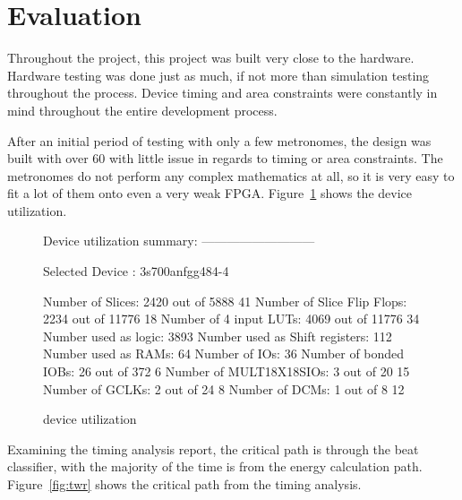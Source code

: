 \documentclass[letterpaper]{article}
\begin{document}
\section{Evaluation}
    Throughout the project, this project was built very close to the hardware.
    Hardware testing was done just as much, if not more than simulation testing
    throughout the process.  Device timing and area constraints were constantly
    in mind throughout the entire development process.

    After an initial period of testing with only a few metronomes, the design
    was built with over 60 with little issue in regards to timing or area
    constraints.  The metronomes do not perform any complex mathematics at all,
    so it is very easy to fit a lot of them onto even a very weak FPGA.
    Figure~\ref{fig:xst} shows the device utilization.


    \begin{figure}
        \centering
\begin{monospace}
Device utilization summary:
---------------------------

Selected Device : 3s700anfgg484-4 

 Number of Slices:                  2420  out of   5888    41%
 Number of Slice Flip Flops:        2234  out of  11776    18%
 Number of 4 input LUTs:            4069  out of  11776    34%
    Number used as logic:           3893
    Number used as Shift registers:  112
    Number used as RAMs:              64
 Number of IOs:                       36
 Number of bonded IOBs:               26  out of    372     6%
 Number of MULT18X18SIOs:              3  out of     20    15%
 Number of GCLKs:                      2  out of     24     8%
 Number of DCMs:                       1  out of      8    12%
\end{monospace}
        \caption{device utilization}
        \label{fig:xst}
    \end{figure}

Examining the timing analysis report, the critical path is through the beat
classifier, with the majority of the time is from the energy calculation path.
Figure~\ref{fig:twr} shows the critical path from the timing analysis.
\end{document}
